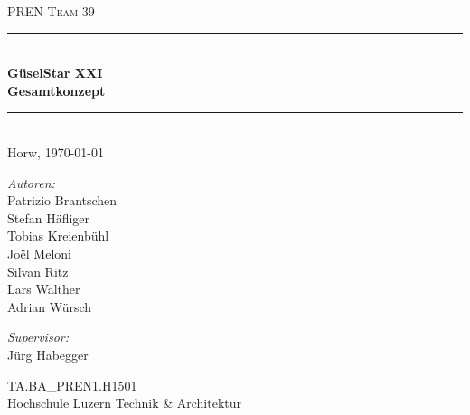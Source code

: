 \begin{titlepage}   

\begin{center}
\textsc{\Large PREN Team 39}\\[0.5cm]

\newcommand{\HRule}{\rule{\linewidth}{0.5mm}}
\HRule \\[0.4cm]
{ \huge \bfseries GüselStar XXI}\\[0.4cm]
{ \LARGE \bfseries Gesamtkonzept}\\[0.4cm]
\HRule \\[1.5cm]

{\large Horw, \today}

\begin{figure}[H]%
\centering
\label{fig:activityRoute}
\end{figure}
\begin{minipage}{0.4\textwidth}
\begin{flushleft} \large
\emph{Autoren:}\\
Patrizio Brantschen\\
Stefan Häfliger\\
Tobias Kreienbühl\\
Joël Meloni\\
Silvan Ritz\\
Lars Walther\\
Adrian Würsch
\end{flushleft}
\end{minipage}
\hfill
\begin{minipage}{0.4\textwidth}
\begin{flushright} \large
\emph{Supervisor:} \\
Jürg Habegger
\end{flushright}
\end{minipage}
\large
\vfill
TA.BA\_PREN1.H1501 \\
Hochschule Luzern Technik \& Architektur

\end{center}

\end{titlepage}